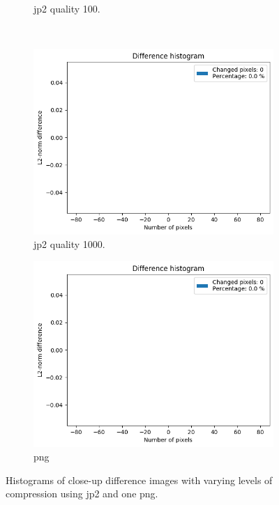 \begin{figure}[htb]
\begin{subfigure}[b]{0.49\textwidth}
            \caption{\gls{jp2} quality 100.}
            \label{fig:img_quality_center_histogram_100}
        \end{subfigure}
        \\
        \begin{subfigure}[b]{0.49\textwidth}
            \centering
            \includegraphics[width=\textwidth]{doc/thesis/0_figures/compare_quality/set1/histograms/jp2_1000_center_diff_histogram.png}
            \caption{\gls{jp2} quality 1000.}
            \label{fig:img_quality_center_histogram_1000}
        \end{subfigure}
        \begin{subfigure}[b]{0.49\textwidth}
            \centering
            \includegraphics[width=\textwidth]{doc/thesis/0_figures/compare_quality/set1/histograms/png_center_diff_histogram.png}
            \caption{\gls{png}}
            \label{fig:img_quality_center_histogram_png}
        \end{subfigure}
    \caption{Histograms of close-up difference images with varying levels of compression using \gls{jp2} and one \gls{png}.}
    \label{fig:img_quality_center_histogram}
\end{figure}

